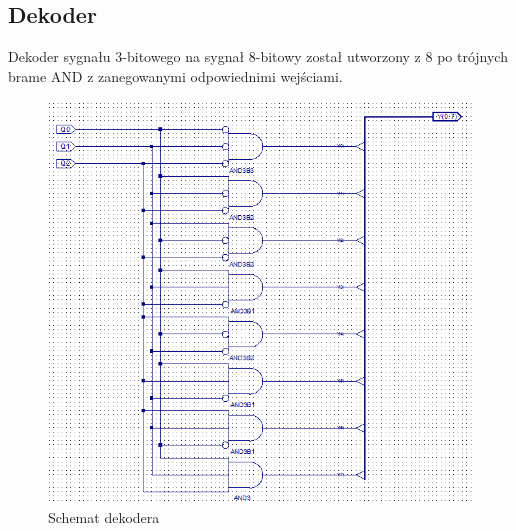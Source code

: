 \documentclass[wide,a4paper,titlepage,12pt] {article}
\begin{document}
  \subsection{Dekoder}
  Dekoder sygnału 3-bitowego na sygnał 8-bitowy został utworzony z 8 po trójnych brame AND z zanegowanymi odpowiednimi wejściami.

  \begin{figure}[htbp]
    \begin{center}
      \includegraphics[scale=0.6]{dekoder.png}
      \caption{Schemat dekodera}
     \end{center}
  \end{figure}
\end{document}
